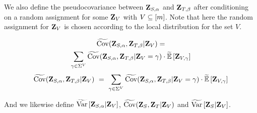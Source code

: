 We also define the pseudocovariance between ${ \mathbf{Z} }_{S,\alpha}$ and ${ \mathbf{Z} }_{T,\beta}$ after
conditioning on a random assignment for some ${ \mathbf{Z} }_V$ with $V\subseteq [m]$. 
%
Note that here the random assignment for ${ \mathbf{Z} }_V$ is chosen according to the local distribution for
the set $V$.

\begin{definition}
\ifnum{}
\begin{multline*}
\tildecov(\zee_{S,\alpha},\zee_{T,\beta} \vert \zee_V) 
= \\ \sum_{\gamma \in \Sigma^V}   \tildecov(\zee_{S,\alpha},\zee_{T,\beta} \vert \zee_V = \gamma) \cdot \tildeEx{\zee_{V,\gamma}}
	\end{multline*}
\else
\begin{align*}
\tildecov(\zee_{S,\alpha},\zee_{T,\beta} \vert \zee_V) 
~=~ \sum_{\gamma \in \Sigma^V}   \tildecov(\zee_{S,\alpha},\zee_{T,\beta} \vert \zee_V = \gamma) \cdot \tildeEx{\zee_{V,\gamma}}
\end{align*}
\fi
\end{definition}

And we likewise define $\tildeVar{\zee_{S,\alpha} \vert \zee_V}$, $\operatorname{\widetilde{\operatorname {Cov}}}({ \mathbf{Z} }_S, { \mathbf{Z} }_T \vert { \mathbf{Z} }_V)$ and $\tildeVar{\zee_S \vert \zee_V}$.






